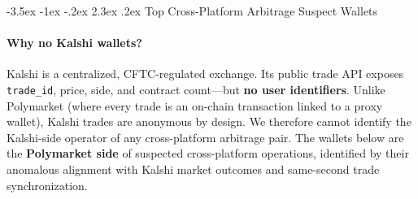 \documentclass[11pt,a4paper]{article}
\makeatletter
\renewcommand\section{\@startsection{section}{1}{\z@}%
  {-3.5ex \@plus -1ex \@minus -.2ex}%
  {2.3ex \@plus .2ex}%
  {\normalfont\Large\bfseries}}
\makeatother
\begin{document}
\appendix
\section{Top Cross-Platform Arbitrage Suspect Wallets}
\label{app:wallets}

\paragraph{Why no Kalshi wallets?} Kalshi is a centralized, CFTC-regulated exchange. Its public trade API exposes \texttt{trade\_id}, price, side, and contract count---but \textbf{no user identifiers}. Unlike Polymarket (where every trade is an on-chain transaction linked to a proxy wallet), Kalshi trades are anonymous by design. We therefore cannot identify the Kalshi-side operator of any cross-platform arbitrage pair. The wallets below are the \textbf{Polymarket side} of suspected cross-platform operations, identified by their anomalous alignment with Kalshi market outcomes and same-second trade synchronization.
\end{document}
